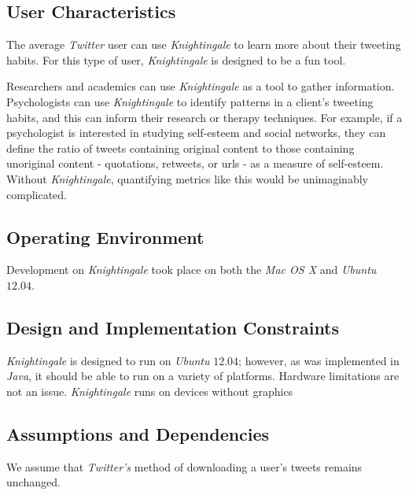 \documentclass[a4paper, 12pt]{article}
\begin{document}
\subsection{User Characteristics} \label{sec:userc}
\begin{adjustwidth}{2em}{0pt}
The average \textit{Twitter} user can use \textit{Knightingale} to learn more about their tweeting habits. For this type of user, \textit{Knightingale} is designed to be a fun tool. \newline

\noindent Researchers and academics can use \textit{Knightingale} as a tool to gather information. Psychologists can use \textit{Knightingale} to identify patterns in a client's tweeting habits, and this can inform their research or therapy techniques. For example, if a psychologist is interested in studying self-esteem and social networks, they can define the ratio of tweets containing original content to those containing unoriginal content - quotations, retweets, or urls - as a measure of self-esteem. Without \textit{Knightingale}, quantifying metrics like this would be unimaginably complicated.
\end{adjustwidth}

\subsection{Operating Environment} \label{sec:operating}
\begin{adjustwidth}{2em}{0pt}
Development on \textit{Knightingale} took place on both the \textit{Mac OS X} and \textit{Ubuntu} $12.04$.
\end{adjustwidth}

\subsection{Design and Implementation Constraints} \label{sec:constraints}
\begin{adjustwidth}{2em}{0pt}
\textit{Knightingale} is designed to run on \textit{Ubuntu} $12.04$; however, as was implemented in \textit{Java}, it should be able to run on a variety of platforms. Hardware limitations are not an issue. \textit{Knightingale} runs on devices without graphics
\end{adjustwidth}

\subsection{Assumptions and Dependencies} \label{sec:and}
\begin{adjustwidth}{2em}{0pt}
We assume that \textit{Twitter's} method of downloading a user's tweets remains unchanged. 
\end{adjustwidth}
\end{document}
